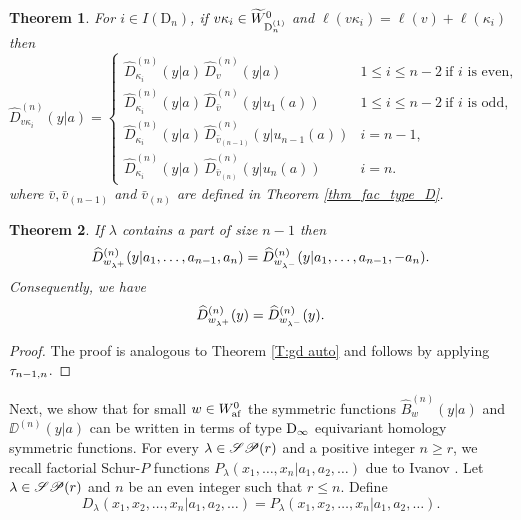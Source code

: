 \documentclass[a4paper]{amsart}
\newtheorem{thm}{Theorem}[section]
\theoremstyle{remark}
\numberwithin{equation}{section}
\begin{document}
\begin{thm}
For $i\in I(\mathrm{D}_n)$, if $v\kappa_i \in \widetilde{W}_{\mathrm{D}_{n}^{(1)}}^0$ and 
$\ell(v\kappa_i) = \ell(v) + \ell(\kappa_i)$ then
    \begin{equation}
\widehat{D}_{v\kappa_i}^{(n)}(y| a) = 
\begin{cases}
\widehat{D}_{\kappa_i}^{(n)}(y| a)
\,\widehat{D}_{v}^{(n)}(y| a) & 1\le i\le n-2~ \text{if $i$ is even}, \\
\widehat{D}_{\kappa_i}^{(n)}(y| a)
\,\widehat{D}_{\bar{v}}^{(n)}(y| u_1(a)) & 1\le i\le n-2~\text{if $i$ is odd},\\
\widehat{D}_{\kappa_i}^{(n)}(y| a)
\,\widehat{D}_{\bar{v}_{(n-1)}}^{(n)}(y| u_{n-1}(a)) & i=n-1,\\
\widehat{D}_{\kappa_i}^{(n)}(y| a)
\,\widehat{D}_{\bar{v}_{(n)}}^{(n)}(y| u_{n}(a)) & i=n.
\end{cases}
\end{equation}
 where $\bar{v}, \bar{v}_{(n-1)}$ and $\bar{v}_{(n)}$ are defined in Theorem \ref{thm_fac_type_D}.
\end{thm}






\begin{thm} If $\lambda$ contains a part of size $n-1$ then
\begin{align*}
\widehat{D}_{w_{\lambda^+}}^{(n)}(y| a_1,\dotsc,a_{n-1},a_n)= 
  \widehat{D}_{w_{\lambda^-}}^{(n)}(y| a_1,\dotsc,a_{n-1},-a_n).
  \end{align*}
Consequently, 
we have
\begin{align*}
\widehat{D}_{w_{\lambda^+}}^{(n)}(y)= 
  \widehat{D}_{w_{\lambda^-}}^{(n)}(y).
  \end{align*}
\end{thm}
\begin{proof}
The proof is analogous to Theorem \ref{T:gd auto} and follows by applying $\tau_{n-1,n}$.
\end{proof}



Next, we show that for small $w\in W_{\mathrm{af}}^0$ the symmetric functions $\widehat{B}_w^{(n)}(y| a)$ and $\DD^{(n)}(y| a)$ can be written in terms of type $\mathrm{D}_{\infty}$ equivariant homology symmetric functions. 
For every $\lambda\in \mathscr{SP}(r)$ and a positive integer $n\geq r$, we recall factorial Schur-$P$ functions $P_\lambda(x_1,\dots,x_n| a_1,a_2,\dots)$ due to Ivanov \cite{Iv}. Let $\lambda\in \mathscr{SP}(r)$ and $n$ be an even integer such that $r\leq n$. Define 
\[D_\lambda(x_1,x_2,\dots,x_{n}| a_1,a_2,\dots)=
    P_\lambda(x_1,x_2,\dots, x_{n}| a_1,a_2,\dots).
\]
\end{document}
